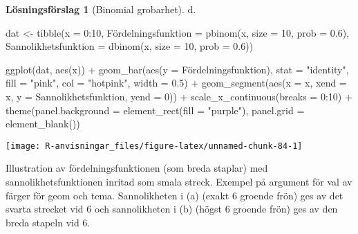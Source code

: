 \documentclass[
]{book}
\newenvironment{Shaded}{\begin{snugshade}}{\end{snugshade}}
\newcommand{\AttributeTok}[1]{\textcolor[rgb]{0.77,0.63,0.00}{#1}}
\newcommand{\DecValTok}[1]{\textcolor[rgb]{0.00,0.00,0.81}{#1}}
\newcommand{\FloatTok}[1]{\textcolor[rgb]{0.00,0.00,0.81}{#1}}
\newcommand{\FunctionTok}[1]{\textcolor[rgb]{0.00,0.00,0.00}{#1}}
\newcommand{\NormalTok}[1]{#1}
\newcommand{\OtherTok}[1]{\textcolor[rgb]{0.56,0.35,0.01}{#1}}
\newcommand{\SpecialCharTok}[1]{\textcolor[rgb]{0.00,0.00,0.00}{#1}}
\newcommand{\StringTok}[1]{\textcolor[rgb]{0.31,0.60,0.02}{#1}}
\theoremstyle{definition}
\theoremstyle{definition}
\theoremstyle{definition}
\theoremstyle{definition}
\newtheorem{hypothesis}{Lösningsförslag}[chapter]
\theoremstyle{remark}
\begin{document}
\begin{hypothesis}[Binomial grobarhet]
d.

\begin{Shaded}
\begin{Highlighting}[]
\NormalTok{dat }\OtherTok{\textless{}{-}} \FunctionTok{tibble}\NormalTok{(}\AttributeTok{x =} \DecValTok{0}\SpecialCharTok{:}\DecValTok{10}\NormalTok{,}
\NormalTok{       Fördelningsfunktion }\OtherTok{=} \FunctionTok{pbinom}\NormalTok{(x, }\AttributeTok{size =} \DecValTok{10}\NormalTok{, }\AttributeTok{prob =} \FloatTok{0.6}\NormalTok{),}
       \AttributeTok{Sannolikhetsfunktion =} \FunctionTok{dbinom}\NormalTok{(x, }\AttributeTok{size =} \DecValTok{10}\NormalTok{, }\AttributeTok{prob =} \FloatTok{0.6}\NormalTok{))}

\FunctionTok{ggplot}\NormalTok{(dat, }\FunctionTok{aes}\NormalTok{(x)) }\SpecialCharTok{+}
  \FunctionTok{geom\_bar}\NormalTok{(}\FunctionTok{aes}\NormalTok{(}\AttributeTok{y =}\NormalTok{ Fördelningsfunktion), }\AttributeTok{stat =} \StringTok{"identity"}\NormalTok{, }
           \AttributeTok{fill =} \StringTok{"pink"}\NormalTok{, }\AttributeTok{col =} \StringTok{"hotpink"}\NormalTok{, }\AttributeTok{width =} \FloatTok{0.5}\NormalTok{) }\SpecialCharTok{+}
  \FunctionTok{geom\_segment}\NormalTok{(}\FunctionTok{aes}\NormalTok{(}\AttributeTok{x =}\NormalTok{ x, }\AttributeTok{xend =}\NormalTok{ x, }
                   \AttributeTok{y =}\NormalTok{ Sannolikhetsfunktion, }\AttributeTok{yend =} \DecValTok{0}\NormalTok{)) }\SpecialCharTok{+}
  \FunctionTok{scale\_x\_continuous}\NormalTok{(}\AttributeTok{breaks =} \DecValTok{0}\SpecialCharTok{:}\DecValTok{10}\NormalTok{) }\SpecialCharTok{+}
  \FunctionTok{theme}\NormalTok{(}\AttributeTok{panel.background =} \FunctionTok{element\_rect}\NormalTok{(}\AttributeTok{fill =} \StringTok{"purple"}\NormalTok{), }
        \AttributeTok{panel.grid =} \FunctionTok{element\_blank}\NormalTok{())}
\end{Highlighting}
\end{Shaded}

\begin{center}\texttt{[image: R-anvisningar\_files/figure-latex/unnamed-chunk-84-1]} \end{center}

Illustration av fördelningsfunktionen (som breda staplar) med sannolikhetsfunktionen inritad som smala streck. Exempel på argument för val av färger för geom och tema. Sannolikheten i (a) (exakt 6 groende frön) ges av det svarta strecket vid 6 och sannolikheten i (b) (högst 6 groende frön) ges av den breda stapeln vid 6.
\end{hypothesis}
\end{document}
